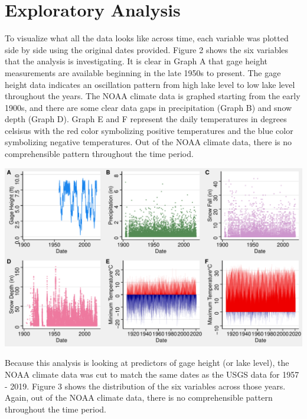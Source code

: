 \documentclass[12pt,]{article}
\let\origfigure\figure
\let\endorigfigure\endfigure
\renewenvironment{figure}[1][2] {
    \expandafter\origfigure\expandafter[H]
} {
    \endorigfigure
}
\begin{document}
\newpage

\hypertarget{exploratory-analysis}{%
\section{Exploratory Analysis}\label{exploratory-analysis}}

To visualize what all the data looks like across time, each variable was
plotted side by side using the original dates provided. Figure 2 shows
the six variables that the analysis is investigating. It is clear in
Graph A that gage height measurements are available beginning in the
late 1950s to present. The gage height data indicates an oscillation
pattern from high lake level to low lake level throughout the years. The
NOAA climate data is graphed starting from the early 1900s, and there
are some clear data gaps in precipitation (Graph B) and snow depth
(Graph D). Graph E and F represent the daily temperatures in degrees
celsisus with the red color symbolizing positive temperatures and the
blue color symbolizing negative temperatures. Out of the NOAA climate
data, there is no comprehensible pattern throughout the time period.

\begin{figure}
\centering
\includegraphics{Shintaku_ENV872_Project_files/figure-latex/unnamed-chunk-3-1.pdf}
\caption{Lake Tahoe Gage Height and Climate Data Time Series 1903-2019}
\end{figure}

Because this analysis is looking at predictors of gage height (or lake
level), the NOAA climate data was cut to match the same dates as the
USGS data for 1957 - 2019. Figure 3 shows the distribution of the six
variables across those years. Again, out of the NOAA climate data, there
is no comprehensible pattern throughout the time period.
\end{document}
